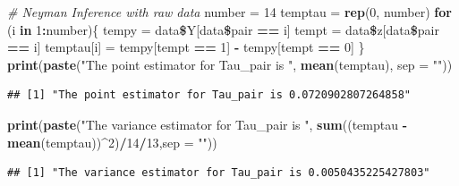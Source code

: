 \documentclass[]{article}
\newenvironment{Shaded}{\begin{snugshade}}{\end{snugshade}}
\newcommand{\KeywordTok}[1]{\textcolor[rgb]{0.13,0.29,0.53}{\textbf{#1}}}
\newcommand{\DataTypeTok}[1]{\textcolor[rgb]{0.13,0.29,0.53}{#1}}
\newcommand{\DecValTok}[1]{\textcolor[rgb]{0.00,0.00,0.81}{#1}}
\newcommand{\StringTok}[1]{\textcolor[rgb]{0.31,0.60,0.02}{#1}}
\newcommand{\CommentTok}[1]{\textcolor[rgb]{0.56,0.35,0.01}{\textit{#1}}}
\newcommand{\ControlFlowTok}[1]{\textcolor[rgb]{0.13,0.29,0.53}{\textbf{#1}}}
\newcommand{\OperatorTok}[1]{\textcolor[rgb]{0.81,0.36,0.00}{\textbf{#1}}}
\newcommand{\NormalTok}[1]{#1}
\begin{document}
\begin{Shaded}
\begin{Highlighting}[]
\CommentTok{# Neyman Inference with raw data}
\NormalTok{number =}\StringTok{ }\DecValTok{14}
\NormalTok{temptau =}\StringTok{ }\KeywordTok{rep}\NormalTok{(}\DecValTok{0}\NormalTok{, number)}
\ControlFlowTok{for}\NormalTok{ (i }\ControlFlowTok{in} \DecValTok{1}\OperatorTok{:}\NormalTok{number)\{}
\NormalTok{  tempy =}\StringTok{ }\NormalTok{data}\OperatorTok{\$}\NormalTok{Y[data}\OperatorTok{\$}\NormalTok{pair }\OperatorTok{==}\StringTok{ }\NormalTok{i]}
\NormalTok{  tempt =}\StringTok{ }\NormalTok{data}\OperatorTok{\$}\NormalTok{z[data}\OperatorTok{\$}\NormalTok{pair }\OperatorTok{==}\StringTok{ }\NormalTok{i]}
\NormalTok{  temptau[i] =}\StringTok{ }\NormalTok{tempy[tempt }\OperatorTok{==}\StringTok{ }\DecValTok{1}\NormalTok{] }\OperatorTok{-}\StringTok{ }\NormalTok{tempy[tempt }\OperatorTok{==}\StringTok{ }\DecValTok{0}\NormalTok{]}
\NormalTok{\}}
\KeywordTok{print}\NormalTok{(}\KeywordTok{paste}\NormalTok{(}\StringTok{"The point estimator for Tau_pair is "}\NormalTok{, }\KeywordTok{mean}\NormalTok{(temptau), }\DataTypeTok{sep =} \StringTok{""}\NormalTok{))}
\end{Highlighting}
\end{Shaded}

\begin{verbatim}
## [1] "The point estimator for Tau_pair is 0.0720902807264858"
\end{verbatim}

\begin{Shaded}
\begin{Highlighting}[]
\KeywordTok{print}\NormalTok{(}\KeywordTok{paste}\NormalTok{(}\StringTok{"The variance estimator for Tau_pair is "}\NormalTok{, }\KeywordTok{sum}\NormalTok{((temptau }\OperatorTok{-}\StringTok{ }\KeywordTok{mean}\NormalTok{(temptau))}\OperatorTok{^}\DecValTok{2}\NormalTok{)}\OperatorTok{/}\DecValTok{14}\OperatorTok{/}\DecValTok{13}\NormalTok{,}\DataTypeTok{sep =} \StringTok{""}\NormalTok{))}
\end{Highlighting}
\end{Shaded}

\begin{verbatim}
## [1] "The variance estimator for Tau_pair is 0.0050435225427803"
\end{verbatim}
\end{document}
